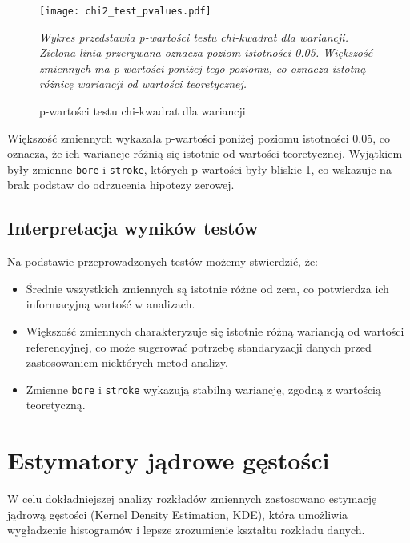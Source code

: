 \documentclass[12pt,a4paper]{article}
\begin{document}
\begin{figure}[H]
    \centering
    \texttt{[image: chi2\_test\_pvalues.pdf]}
    \caption{p-wartości testu chi-kwadrat dla wariancji}
    \label{fig:chi2_test_pval}
    \small\textit{Wykres przedstawia p-wartości testu chi-kwadrat dla wariancji. Zielona linia przerywana oznacza poziom istotności 0.05. Większość zmiennych ma p-wartości poniżej tego poziomu, co oznacza istotną różnicę wariancji od wartości teoretycznej.}
\end{figure}

Większość zmiennych wykazała p-wartości poniżej poziomu istotności 0.05, co oznacza, że ich wariancje różnią się istotnie od wartości teoretycznej. Wyjątkiem były zmienne \texttt{bore} i \texttt{stroke}, których p-wartości były bliskie 1, co wskazuje na brak podstaw do odrzucenia hipotezy zerowej.

\subsection{Interpretacja wyników testów}

Na podstawie przeprowadzonych testów możemy stwierdzić, że:
\begin{itemize}
    \item Średnie wszystkich zmiennych są istotnie różne od zera, co potwierdza ich informacyjną wartość w analizach.
    
    \item Większość zmiennych charakteryzuje się istotnie różną wariancją od wartości referencyjnej, co może sugerować potrzebę standaryzacji danych przed zastosowaniem niektórych metod analizy.
    
    \item Zmienne \texttt{bore} i \texttt{stroke} wykazują stabilną wariancję, zgodną z wartością teoretyczną.
\end{itemize}

\section{Estymatory jądrowe gęstości}

W celu dokładniejszej analizy rozkładów zmiennych zastosowano estymację jądrową gęstości (Kernel Density Estimation, KDE), która umożliwia wygładzenie histogramów i lepsze zrozumienie kształtu rozkładu danych.
\end{document}
